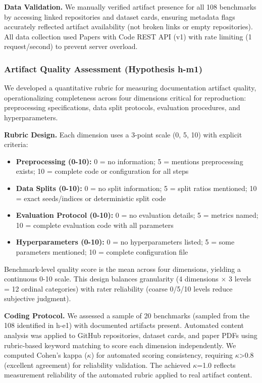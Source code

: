 \textbf{Data Validation.} We manually verified artifact presence for all 108 benchmarks by accessing linked repositories and dataset cards, ensuring metadata flags accurately reflected artifact availability (not broken links or empty repositories). All data collection used Papers with Code REST API (v1) with rate limiting (1 request/second) to prevent server overload.

\subsubsection{Artifact Quality Assessment (Hypothesis h-m1)}

We developed a quantitative rubric for measuring documentation artifact quality, operationalizing completeness across four dimensions critical for reproduction: preprocessing specifications, data split protocols, evaluation procedures, and hyperparameters.

\textbf{Rubric Design.} Each dimension uses a 3-point scale (0, 5, 10) with explicit criteria:
\begin{itemize}
\item \textbf{Preprocessing (0-10):} 0 = no information; 5 = mentions preprocessing exists; 10 = complete code or configuration for all steps
\item \textbf{Data Splits (0-10):} 0 = no split information; 5 = split ratios mentioned; 10 = exact seeds/indices or deterministic split code
\item \textbf{Evaluation Protocol (0-10):} 0 = no evaluation details; 5 = metrics named; 10 = complete evaluation code with all parameters
\item \textbf{Hyperparameters (0-10):} 0 = no hyperparameters listed; 5 = some parameters mentioned; 10 = complete configuration file
\end{itemize}

Benchmark-level quality score is the mean across four dimensions, yielding a continuous 0-10 scale. This design balances granularity (4 dimensions $\times$ 3 levels = 12 ordinal categories) with rater reliability (coarse 0/5/10 levels reduce subjective judgment).

\textbf{Coding Protocol.} We assessed a sample of 20 benchmarks (sampled from the 108 identified in h-e1) with documented artifacts present. Automated content analysis was applied to GitHub repositories, dataset cards, and paper PDFs using rubric-based keyword matching to score each dimension independently. We computed Cohen's kappa ($\kappa$) for automated scoring consistency, requiring $\kappa$>0.8 (excellent agreement) for reliability validation. The achieved $\kappa$=1.0 reflects measurement reliability of the automated rubric applied to real artifact content.

